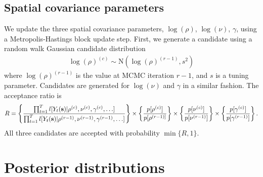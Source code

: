 \documentclass[useAMS,usenatbib,referee]{biomweb}
\begin{document}
\subsection*{Spatial covariance parameters}
We update the three spatial covariance parameters, $\log(\rho)$, $\log(\nu)$, $\gamma$, using a Metropolis-Hastings block update step.
First, we generate a candidate using a random walk Gaussian candidate distribution
\begin{align*}
	\log(\rho)^{(c)} \sim \text{N}(\log(\rho)^{(r - 1)}, s^2)
\end{align*}
where $\log(\rho)^{(r-1)}$ is the value at MCMC iteration $r - 1$, and $s$ is a tuning parameter.
Candidates are generated for $\log(\nu)$ and $\gamma$ in a similar fashion.
The acceptance ratio is
\begin{align*}
	R = \left\{ \frac{ \prod_{t = 1}^{T} l[Y_t(\mbox{\bf s}) | \rho^{(c)}, \nu^{(c)}, \gamma^{(c)}, \ldots] }{\prod_{t = 1}^{T} l[Y_t(\mbox{\bf s}) | \rho^{(r-1)}, \nu^{(r-1)}, \gamma^{(r-1)}, \ldots] } \right\} \times \left\{ \frac{ p[\rho^{(c)}] }{ p[\rho^{(r - 1)] } } \right\} \times \left\{ \frac{ p[\nu^{(c)}] }{ p[\nu^{(r - 1)}] } \right\} \times \left\{ \frac{ p[ \gamma^{(c)} ] }{ p[\gamma^{(r - 1)} ] } \right\}.
\end{align*}
All three candidates are accepted with probability $\min\{R, 1\}$.

\section{Posterior distributions} \label{a:posterior}
\end{document}
